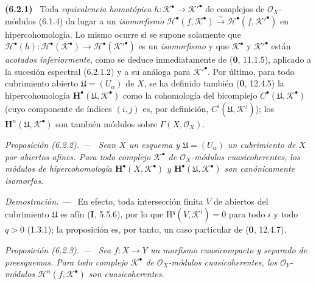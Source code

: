 \documentclass[10pt,oneside]{book}
\newenvironment{env}[1][]{\par\medskip\noindent\textbf{(#1)}\ }{\par}
\newenvironment{proposition}[1][]{\par\medskip\noindent\itshape Proposición (#1). ---\ }{\par}
\newenvironment{proof}{\par\medskip\noindent\textit{Demostración. ---\ }}{\par}
\begin{document}
\begin{env}[6.2.1]
Toda \emph{equivalencia homotópica} $h:\mathscr K^\bullet\to\mathscr K'^\bullet$ de complejos de
$\mathscr O_X$-módulos (6.1.4) da lugar a un \emph{isomorfismo}
$\mathscr H^\bullet(f,\mathscr K^\bullet)\xrightarrow{\sim}
\mathscr H^\bullet(f,\mathscr K'^\bullet)$ en hipercohomología. Lo mismo ocurre
si se supone solamente que
$\mathscr H^\bullet(h):\mathscr H^\bullet(\mathscr K^\bullet)\to
\mathscr H^\bullet(\mathscr K'^\bullet)$ es un \emph{isomorfismo} y que
$\mathscr K^\bullet$ y $\mathscr K'^\bullet$ están \emph{acotados inferiormente},
como se deduce inmediatamente de (\textbf 0, 11.1.5), aplicado a la sucesión espectral
(6.2.1.2) y a su análoga para $\mathscr K'^\bullet$. Por último, para todo
cubrimiento abierto $\mathfrak U=(U_\alpha)$ de $X$, se ha definido también
(\textbf 0, 12.4.5) la hipercohomología
$\mathbf H^\bullet(\mathfrak U,\mathscr K^\bullet)$ como la cohomología del
bicomplejo $C^\bullet(\mathfrak U,\mathscr K^\bullet)$ (cuyo componente de
índices $(i,j)$ es, por definición,
$C^i(\mathfrak U,\mathscr K^j)$); los
$\mathbf H^n(\mathfrak U,\mathscr K^\bullet)$ son también módulos sobre
$\Gamma(X,\mathscr O_X)$.
\end{env}

\begin{proposition}[6.2.2]
Sean $X$ un esquema y $\mathfrak U=(U_\alpha)$ un cubrimiento de $X$ por
abiertos afines. Para todo complejo $\mathscr K^\bullet$ de
$\mathscr O_X$-módulos cuasicoherentes, los módulos de hipercohomología
$\mathbf H^\bullet(X,\mathscr K^\bullet)$ y
$\mathbf H^\bullet(\mathfrak U,\mathscr K^\bullet)$ son canónicamente
isomorfos.
\end{proposition}

\begin{proof}
En efecto, toda intersección finita $V$ de abiertos del cubrimiento
$\mathfrak U$ es afín (\textbf I, 5.5.6), por lo que
$\mathrm H^q(V,\mathscr K^i)=0$ para todo $i$ y todo $q>0$ (1.3.1); la
proposición es, por tanto, un caso particular de (\textbf 0, 12.4.7).
\end{proof}

\begin{proposition}[6.2.3]
Sea $f:X\to Y$ un morfismo cuasicompacto y separado de preesquemas. Para todo
complejo $\mathscr K^\bullet$ de $\mathscr O_X$-módulos cuasicoherentes, los
$\mathscr O_Y$-módulos $\mathscr H^n(f,\mathscr K^\bullet)$ son
cuasicoherentes.
\end{proposition}
\end{document}
